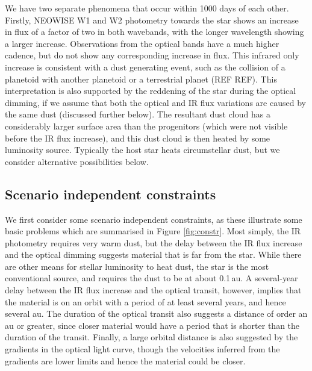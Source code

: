 \documentclass{aa}
\newcommand{\asas}{ASASSN-21qj}
\begin{document}
We have two separate phenomena that occur within 1000 days of each other.
%
Firstly, NEOWISE W1 and W2 photometry towards the star shows an increase in flux of a factor of two in both wavebands, with the longer wavelength showing a larger increase.
%
Observations from the optical bands have a much higher cadence, but do not show any corresponding increase in flux.
%
This infrared only increase is consistent with a dust generating event, such as the collision of a planetoid with another planetoid or a terrestrial planet (REF REF).
%
This interpretation is also supported by the reddening of the star during the optical dimming, if we assume that both the optical and IR flux variations are caused by the same dust (discussed further below).
%
The resultant dust cloud has a considerably larger surface area than the progenitors (which were not visible before the IR flux increase), and this dust cloud is then heated by some luminosity source.
%
Typically the host star heats circumstellar dust, but we consider alternative possibilities below.
%


\subsection{Scenario independent constraints}

We first consider some scenario independent constraints, as these illustrate some basic problems which are summarised in Figure \ref{fig:constr}.
%
Most simply, the IR photometry requires very warm dust, but the delay between the IR flux increase and the optical dimming suggests material that is far from the star.
%
While there are other means for stellar luminosity to heat dust, the star is the most conventional source, and requires the dust to be at about 0.1\,au.
%
A several-year delay between the IR flux increase and the optical transit, however, implies that the material is on an orbit with a period of at least several years, and hence several au.
%
The duration of the optical transit also suggests a distance of order an au or greater, since closer material would have a period that is shorter than the duration of the transit.
%
Finally, a large orbital distance is also suggested by the gradients in the optical light curve, though the velocities inferred from the gradients are lower limits and hence the material could be closer.
\end{document}
